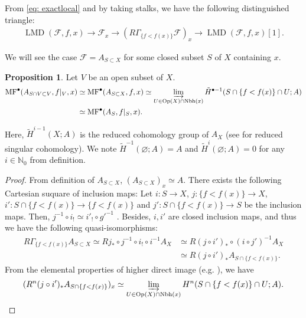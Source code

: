 \documentclass[a4paper,dvipdfmx,reqno,12pt]{amsart}
\theoremstyle{definition}
\newtheorem{Prop}[Thm]{Proposition}
\newcommand{\emp}{\varnothing}%
\newcommand{\N}{\mathbb{N}_{0}}%
\newcommand{\opn}[1]{\operatorname{#1}}
\numberwithin{equation}{section}
\begin{document}
From \cref{eq: exactlocal} and by taking stalks,
we have the following distinguished triangle:
\begin{align}
\opn{LMD}(\mathcal{F},f,x) \to \mathcal{F}_x\to 
(R\Gamma_{\{f<f(x)\}}\mathcal{F})_x\to 
\opn{LMD}(\mathcal{F},f,x)[1].
\end{align}

We will see the case $\mathcal{F}=A_{S\subset X}$ 
for some closed subset $S$ of $X$ containing $x$. 

\begin{Prop} \label{prop-local-morse-data}
Let $V$ be an open subset of $X$.
\begin{align}
\opn{MF}^{\bullet}(A_{S\cap V\subset V},f|_V,x)&\simeq 
\opn{MF}^{\bullet}(A_{S\subset X},f,x
) \simeq \varinjlim_{U\in \opn{Op}(X)\cap \opn{Nbh}(x)} 
\tilde{H}^{\bullet-1}(S\cap \{f<f(x)\}\cap U;A) \\
& \simeq \opn{MF}^{\bullet}(A_S,f|_S,x).
\end{align}

\end{Prop}

Here, $\tilde{H}^{i-1}(X;A)$ is the reduced cohomology 
group
of $A_X$ (see 
\cite[p.199]{hatcherAlgebraicTopology2002a} for 
reduced singular cohomology).
We note $\tilde{H}^{-1}(\emp;A)=A$ and $\tilde{H}^{i}(\emp;A)=0$
for any $i\in \N$ from definition.

\begin{proof}


From definition of $A_{S\subset X}$, 
$(A_{S\subset X})_x\simeq A$.
There exists the following Cartesian suquare of 
inclusion maps:
Let $i\colon S\to X$, 
$j\colon \{f<f(x)\}\to X$, 
$i'\colon S\cap \{f<f(x)\} \to \{f<f(x)\}$ and 
$j'\colon S\cap \{f<f(x)\} \to S$
 be the inclusion maps.
Then, 
$j^{-1}\circ i_!\simeq i'_!\circ g'^{-1}$ 
\cite[Proposition 2.5.11]{MR1299726}.
Besides, $i,i'$ are closed inclusion maps, and thus
we have the following quasi-isomorphisms:
\begin{align}
R\Gamma_{\{f<f(x)\}}A_{S\subset X}\simeq 
Rj_*\circ j^{-1} \circ i_! \circ i^{-1}A_X&\simeq 
R (j \circ i')_*\circ (i\circ j')^{-1}A_X \\
&\simeq R (j \circ i')_* A_{S\cap \{f<f(x)\}}.
\end{align}
From the elemental properties of higher direct image
(e.g. \cite[II. Proposition 5.11]{iversenCohomologySheaves1986a}), we have
\begin{align}
  (R^{n} (j \circ i')_* A_{S\cap \{f<f(x)\}})_x\simeq 
\varinjlim_{U\in \opn{Op}(X)\cap \opn{Nbh}(x)} 
H^{n}(S\cap \{f<f(x)\}\cap U;A).
\end{align}
\end{proof}
\end{document}
